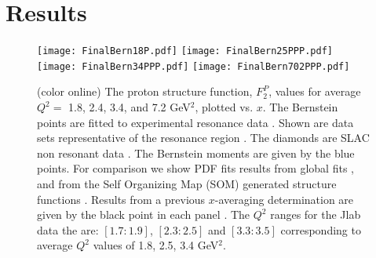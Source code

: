 \documentclass[
twocolumn,
aps,prd,
nofootinbib,
superscriptaddress,
showpacs,ligh
tightenlines, 
]{revtex4}
\begin{document}
\section{Results}
\label{sec3}
\vspace{-0.5cm}
\begin{figure}[htp]
\vspace{-0.5cm}
\texttt{[image: FinalBern18P.pdf]}
\vspace{-0.5cm}
\texttt{[image: FinalBern25PPP.pdf]}
\vspace{-0.5cm}
\texttt{[image: FinalBern34PPP.pdf]}
\texttt{[image: FinalBern702PPP.pdf]}

\caption{(color online) The proton structure function, $F_{2}^{P}$, values 
for average $Q^{2}=$
1.8, 2.4, 3.4, and 7.2 GeV$^2$, plotted vs. $x$. The Bernstein points are fitted to experimental resonance data \cite{hallc,Stein:1975,Dasu:1988,Rock:1992,Bodek:1979,Stuart:1998,Dasu2:1988}. Shown are data sets representative of the resonance region \cite{Christy}. The diamonds are SLAC non resonant data \cite{Whitlow:1991uw}. The Bernstein moments are given by the blue points. For comparison we show PDF fits results from global fits \cite{Accardi:2011,Buckley:2014ana,Lai:2010vv}, and from the Self Organizing Map (SOM) generated structure functions \cite{Askanazi:2014gxa}.  Results from a previous $x$-averaging determination are given by the black point in each panel \cite{Bianchi:2003hi}. The $Q^2$ ranges  for the Jlab  data  the  are: $[1.7:1.9]$, $[2.3:2.5]$ and $[3.3:3.5]$ corresponding to average $Q^2$ values of 1.8, 2.5, 3.4 GeV$^2$. 
}
\label{fig:FinalBern18P}
\end{figure}
\end{document}
